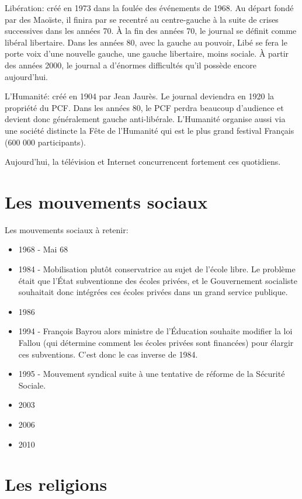 \documentclass[12pt, a4paper, openany]{book}
\begin{document}
Libération: créé en 1973 dans la foulée des événements de 1968. Au départ fondé par des Maoïste, il finira par se recentré au centre-gauche à la suite de crises successives dans les années 70. À la fin des années 70, le journal se définit comme libéral libertaire. Dans les années 80, avec la gauche au pouvoir, Libé se fera le porte voix d'une nouvelle gauche, une gauche libertaire, moins sociale. À partir des années 2000, le journal a d'énormes difficultés qu'il possède encore aujourd'hui.


L'Humanité: créé en 1904 par Jean Jaurès. Le journal deviendra en 1920 la propriété du PCF. Dans les années 80, le PCF perdra beaucoup d'audience et devient donc généralement gauche anti-libérale. L'Humanité organise aussi via une société distincte la Fête de l'Humanité qui est le plus grand festival Français (600 000 participants).


Aujourd'hui, la télévision et Internet concurrencent fortement ces quotidiens. 

\chapter{Les mouvements sociaux}

Les mouvements sociaux à retenir:
\begin{itemize}
\item 1968 - Mai 68
\item 1984 - Mobilisation plutôt conservatrice au sujet de l'école libre. Le problème était que l'État subventionne des écoles privées, et le Gouvernement socialiste souhaitait donc intégrées ces écoles privées dans un grand service publique.
\item 1986
\item 1994 - François Bayrou alors ministre de l'Éducation souhaite modifier la loi Fallou (qui détermine comment les écoles privées sont financées) pour élargir ces subventions. C'est donc le cas inverse de 1984. 
\item 1995 - Mouvement syndical suite à une tentative de réforme de la Sécurité Sociale. 
\item 2003
\item 2006
\item 2010
\end{itemize}






\chapter{Les religions}
\end{document}
